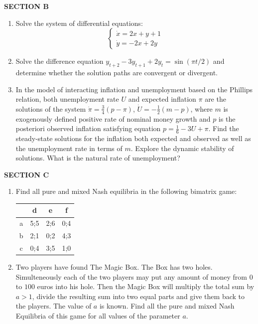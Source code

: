 \documentclass[12pt]{article} %
\theoremstyle{definition} %
\begin{document}
\vspace{20pt}
\textbf{SECTION B}
\vspace{20pt}

\begin{enumerate}[resume]
\item Solve the system of differential equations:
\[
\begin{cases}
\dot{x}=2x+y+1 \\
\dot{y}=-2x+2y
\end{cases}
\]
\item Solve the difference equation $y_{t+2}-3y_{t+1}+2y_t=\sin(\pi t/2)$ and determine whether the solution paths are convergent or divergent.

\item In the model of interacting inflation and unemployment based on the Phillips relation,  both unemployment rate $U$ and expected inflation $\pi$ are the solutions of the system $\dot{\pi}=\frac{3}{4}(p-\pi)$, $\dot{U}=-\frac{1}{2}(m-p)$, where $m$ is exogenously defined positive rate of nominal money growth and $p$ is the posteriori observed inflation satisfying equation $p=\frac{1}{6}-3U+\pi$. Find the steady-state solutions for the inflation both expected and observed as well as the unemployment rate in terms of $m$. Explore the dynamic stability of solutions. What is the natural rate of unemployment?
\end{enumerate}

\vspace{20pt}
\textbf{SECTION C}
\vspace{20pt}

\begin{enumerate}[resume]
\item Find all pure and mixed Nash equilibria in the following bimatrix game:


\begin{tabular}{c|ccc}
 & d & e & f \\
\hline
a & 5;5 & 2;6 & 0;4  \\
b & 2;1 & 0;2 & 4;3  \\
c & 0;4 & 3;5 & 1;0  \\
\end{tabular}


\item Two players have found The Magic Box. The Box has two holes. Simulteneously each of the two players may put any amount of money from $0$ to $100$ euros into his hole. Then the Magic Box will multiply the total sum by $a>1$, divide the resulting sum into two equal parts and give them back to the players. The value of $a$ is known. Find all the pure and mixed Nash Equilibria of this game for all values of the parameter $a$.

\end{enumerate}
\end{document}
